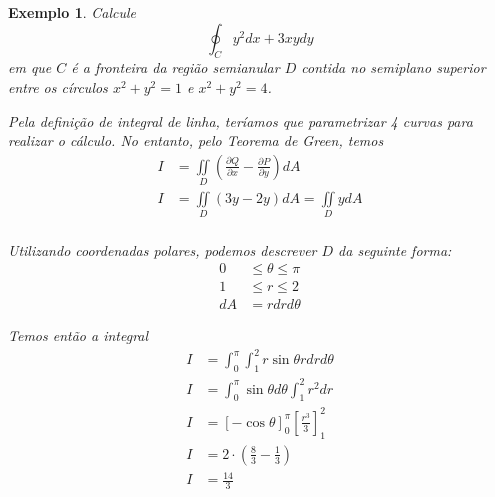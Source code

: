 \documentclass{article}
\newcommand{\doubleint}[2] {\iint\limits_{#1} #2}
\newcommand{\PartialDer}[2] {\frac{\partial #1}{\partial #2}}
\newtheorem{example}{Exemplo}[section]
\begin{document}
        \begin{example}
            Calcule
            \[
                \oint_C y^2 dx + 3xy dy
            \]
            em que $C$ é a fronteira da região semianular $D$ contida no semiplano superior entre os círculos
            $x^2 + y^2 = 1$ e $x^2 + y^2 = 4$.

            Pela definição de integral de linha, teríamos que parametrizar 4 curvas para realizar o cálculo. No entanto, pelo
            Teorema de Green, temos
            \begin{align*}
                I &= \doubleint{D}{\left( \PartialDer{Q}{x} - \PartialDer{P}{y} \right) dA}\\
                I &= \doubleint{D}{(3y - 2y) dA} = \doubleint{D}{y dA}\\
            \end{align*}

            Utilizando coordenadas polares, podemos descrever $D$ da seguinte forma:
            \begin{align*}
                0 &\leq \theta \leq \pi\\
                1 &\leq r \leq 2\\
                dA &= r dr d\theta
            \end{align*}

            Temos então a integral
            \begin{align*}
                I &= \int_0^\pi \int_1^2 r \sin \theta r dr d\theta\\
                I &= \int_0^\pi \sin \theta d\theta \int_1^2 r^2 dr\\
                I &= \left[ - \cos \theta \right]_0^\pi \left[ \frac{r^3}{3} \right]_1^2\\
                I &= 2 \cdot \left(\frac{8}{3} - \frac{1}{3}\right)\\
                I &= \frac{14}{3}
            \end{align*}
        \end{example}
\end{document}
